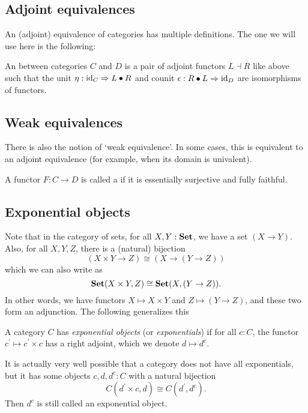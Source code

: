 \subsection{Adjoint equivalences}
An (adjoint) equivalence of categories has multiple definitions. The one we will use here is the following:

\begin{definition}\label{def:equivalence-of-categories}
  An  between categories $ C $ and $ D $ is a pair of adjoint functors $ L \dashv R $ like above such that the unit $ \eta: \text{id}_{C} \Rightarrow L \bullet R $ and counit $ \epsilon: R \bullet L \Rightarrow \text{id}_{D} $ are isomorphisms of functors.
\end{definition}

\subsection{Weak equivalences}
There is also the notion of `weak equivalence'. In some cases, this is equivalent to an adjoint equivalence (for example, when its domain is univalent).
\begin{definition}
  A functor $ F: C \to D $ is called a  if it is essentially surjective and fully faithful.
\end{definition}

\subsection{Exponential objects}
Note that in the category of sets, for all $ X, Y: \mathbf{Set} $, we have a set $ (X \to Y) $. Also, for all $ X, Y, Z $, there is a (natural) bijection
\[ (X \times Y \to Z) \cong (X \to (Y \to Z)) \]
which we can also write as
\[ \mathbf{Set}(X \times Y, Z) \cong \mathbf{Set}(X, (Y \to Z)). \]
In other words, we have functors $ X \mapsto X \times Y $ and $ Z \mapsto (Y \to Z) $, and these two form an adjunction. The following generalizes this
\begin{definition}
  A category $ C $ has \textit{exponential objects} (or \textit{exponentials}) if for all $ c: C $, the functor $ c^\prime \mapsto c^\prime \times c $ has a right adjoint, which we denote $ d \mapsto d^c $.
\end{definition}

\begin{remark}
  It is actually very well possible that a category does not have all exponentials, but it has some objects $ c, d, d^c: C $ with a natural bijection
  \[ C(d^\prime \times c, d) \cong C(d^\prime, d^c). \]
  Then $ d^c $ is still called an exponential object.
\end{remark}

